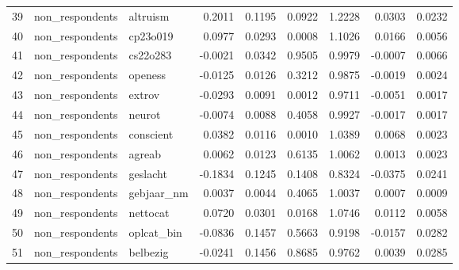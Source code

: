 \begin{table}[ht]
\begin{tabular}{rllrrrrrr}
  39 & non\_respondents & altruism & 0.2011 & 0.1195 & 0.0922 & 1.2228 & 0.0303 & 0.0232 \\ 
  40 & non\_respondents & cp23o019 & 0.0977 & 0.0293 & 0.0008 & 1.1026 & 0.0166 & 0.0056 \\ 
  41 & non\_respondents & cs22o283 & -0.0021 & 0.0342 & 0.9505 & 0.9979 & -0.0007 & 0.0066 \\ 
  42 & non\_respondents & openess & -0.0125 & 0.0126 & 0.3212 & 0.9875 & -0.0019 & 0.0024 \\ 
  43 & non\_respondents & extrov & -0.0293 & 0.0091 & 0.0012 & 0.9711 & -0.0051 & 0.0017 \\ 
  44 & non\_respondents & neurot & -0.0074 & 0.0088 & 0.4058 & 0.9927 & -0.0017 & 0.0017 \\ 
  45 & non\_respondents & conscient & 0.0382 & 0.0116 & 0.0010 & 1.0389 & 0.0068 & 0.0023 \\ 
  46 & non\_respondents & agreab & 0.0062 & 0.0123 & 0.6135 & 1.0062 & 0.0013 & 0.0023 \\ 
  47 & non\_respondents & geslacht & -0.1834 & 0.1245 & 0.1408 & 0.8324 & -0.0375 & 0.0241 \\ 
  48 & non\_respondents & gebjaar\_nm & 0.0037 & 0.0044 & 0.4065 & 1.0037 & 0.0007 & 0.0009 \\ 
  49 & non\_respondents & nettocat & 0.0720 & 0.0301 & 0.0168 & 1.0746 & 0.0112 & 0.0058 \\ 
  50 & non\_respondents & oplcat\_bin & -0.0836 & 0.1457 & 0.5663 & 0.9198 & -0.0157 & 0.0282 \\ 
  51 & non\_respondents & belbezig & -0.0241 & 0.1456 & 0.8685 & 0.9762 & 0.0039 & 0.0285 \\ 
   \hline
\end{tabular}
\end{table}
